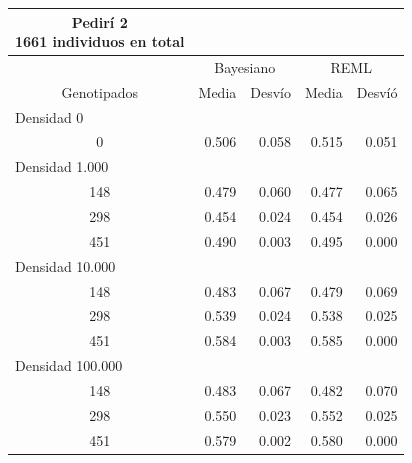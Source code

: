 \documentclass[11pt,spanish,a4paper,oneside,]{book} %
\begin{document}
\begin{longtable}{crrrr}
\caption*{
{\large Pedirí 2} \\ 
{\small 1661 individuos en total}
} \\ 
\toprule
 & \multicolumn{2}{c}{Bayesiano} & \multicolumn{2}{c}{REML} \\ 
 \cmidrule(lr){2-3} \cmidrule(lr){4-5}
Genotipados & Media & Desvío & Media & Desvíó \\ 
\midrule
\multicolumn{1}{l}{Densidad 0} \\ 
\midrule
0 & 0.506 & 0.058 & 0.515 & 0.051 \\ 
\midrule
\multicolumn{1}{l}{Densidad 1.000} \\ 
\midrule
148 & 0.479 & 0.060 & 0.477 & 0.065 \\ 
298 & 0.454 & 0.024 & 0.454 & 0.026 \\ 
451 & 0.490 & 0.003 & 0.495 & 0.000 \\ 
\midrule
\multicolumn{1}{l}{Densidad 10.000} \\ 
\midrule
148 & 0.483 & 0.067 & 0.479 & 0.069 \\ 
298 & 0.539 & 0.024 & 0.538 & 0.025 \\ 
451 & 0.584 & 0.003 & 0.585 & 0.000 \\ 
\midrule
\multicolumn{1}{l}{Densidad 100.000} \\ 
\midrule
148 & 0.483 & 0.067 & 0.482 & 0.070 \\ 
298 & 0.550 & 0.023 & 0.552 & 0.025 \\ 
451 & 0.579 & 0.002 & 0.580 & 0.000 \\ 
 \bottomrule
\end{longtable}
\captionsetup[table]{labelformat=empty,skip=1pt}
\end{document}
